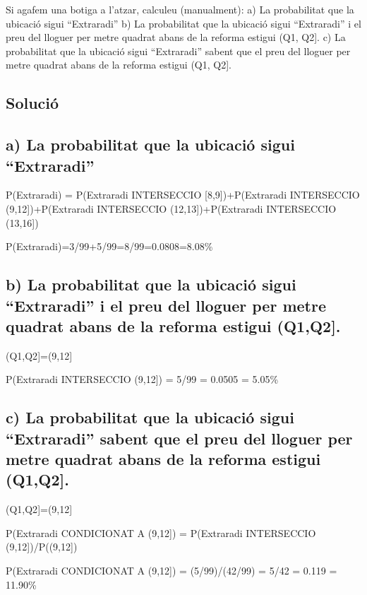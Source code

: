 \documentclass[
]{article}
\begin{document}
Si agafem una botiga a l'atzar, calculeu (manualment): a) La
probabilitat que la ubicació sigui ``Extraradi'' b) La probabilitat que
la ubicació sigui ``Extraradi'' i el preu del lloguer per metre quadrat
abans de la reforma estigui (Q1, Q2{]}. c) La probabilitat que la
ubicació sigui ``Extraradi'' sabent que el preu del lloguer per metre
quadrat abans de la reforma estigui (Q1, Q2{]}.

\hypertarget{soluciuxf3-2}{%
\subsection{Solució}\label{soluciuxf3-2}}

\hypertarget{a-la-probabilitat-que-la-ubicaciuxf3-sigui-extraradi}{%
\subsection{a) La probabilitat que la ubicació sigui
``Extraradi''}\label{a-la-probabilitat-que-la-ubicaciuxf3-sigui-extraradi}}

P(Extraradi) = P(Extraradi INTERSECCIO {[}8,9{]})+P(Extraradi
INTERSECCIO (9,12{]})+P(Extraradi INTERSECCIO (12,13{]})+P(Extraradi
INTERSECCIO (13,16{]})

P(Extraradi)=3/99+5/99=8/99=0.0808=8.08\%

\hypertarget{b-la-probabilitat-que-la-ubicaciuxf3-sigui-extraradi-i-el-preu-del-lloguer-per-metre-quadrat-abans-de-la-reforma-estigui-q1q2.}{%
\subsection{b) La probabilitat que la ubicació sigui ``Extraradi'' i el
preu del lloguer per metre quadrat abans de la reforma estigui
(Q1,Q2{]}.}\label{b-la-probabilitat-que-la-ubicaciuxf3-sigui-extraradi-i-el-preu-del-lloguer-per-metre-quadrat-abans-de-la-reforma-estigui-q1q2.}}

(Q1,Q2{]}=(9,12{]}

P(Extraradi INTERSECCIO (9,12{]}) = 5/99 = 0.0505 = 5.05\%

\hypertarget{c-la-probabilitat-que-la-ubicaciuxf3-sigui-extraradi-sabent-que-el-preu-del-lloguer-per-metre-quadrat-abans-de-la-reforma-estigui-q1q2.}{%
\subsection{c) La probabilitat que la ubicació sigui ``Extraradi''
sabent que el preu del lloguer per metre quadrat abans de la reforma
estigui
(Q1,Q2{]}.}\label{c-la-probabilitat-que-la-ubicaciuxf3-sigui-extraradi-sabent-que-el-preu-del-lloguer-per-metre-quadrat-abans-de-la-reforma-estigui-q1q2.}}

(Q1,Q2{]}=(9,12{]}

P(Extraradi CONDICIONAT A (9,12{]}) = P(Extraradi INTERSECCIO
(9,12{]})/P((9,12{]})

P(Extraradi CONDICIONAT A (9,12{]}) = (5/99)/(42/99) = 5/42 = 0.119 =
11.90\%
\end{document}
